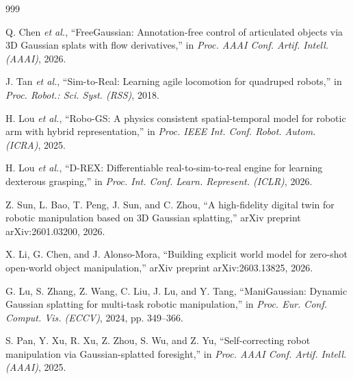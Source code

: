 \documentclass[12pt,a4paper,oneside]{report}
\begin{document}
\begin{thebibliography}{999}

Q. Chen \textit{et al.}, ``{FreeGaussian}: Annotation-free control of articulated objects via {3D} Gaussian splats with flow derivatives,'' in \textit{Proc. AAAI Conf. Artif. Intell. (AAAI)}, 2026.




J. Tan \textit{et al.}, ``{Sim-to-Real}: Learning agile locomotion for quadruped robots,'' in \textit{Proc. Robot.: Sci. Syst. (RSS)}, 2018.




H. Lou \textit{et al.}, ``{Robo-GS}: A physics consistent spatial-temporal model for robotic arm with hybrid representation,'' in \textit{Proc. IEEE Int. Conf. Robot. Autom. (ICRA)}, 2025.




H. Lou \textit{et al.}, ``D-REX: Differentiable real-to-sim-to-real engine for learning dexterous grasping,'' in \textit{Proc. Int. Conf. Learn. Represent. (ICLR)}, 2026.




Z. Sun, L. Bao, T. Peng, J. Sun, and C. Zhou, ``A high-fidelity digital twin for robotic manipulation based on {3D} Gaussian splatting,'' arXiv preprint arXiv:2601.03200, 2026.




X. Li, G. Chen, and J. Alonso-Mora, ``Building explicit world model for zero-shot open-world object manipulation,'' arXiv preprint arXiv:2603.13825, 2026.




G. Lu, S. Zhang, Z. Wang, C. Liu, J. Lu, and Y. Tang, ``{ManiGaussian}: Dynamic Gaussian splatting for multi-task robotic manipulation,'' in \textit{Proc. Eur. Conf. Comput. Vis. (ECCV)}, 2024, pp. 349--366.




S. Pan, Y. Xu, R. Xu, Z. Zhou, S. Wu, and Z. Yu, ``Self-correcting robot manipulation via Gaussian-splatted foresight,'' in \textit{Proc. AAAI Conf. Artif. Intell. (AAAI)}, 2025.




\end{thebibliography}
\end{document}
